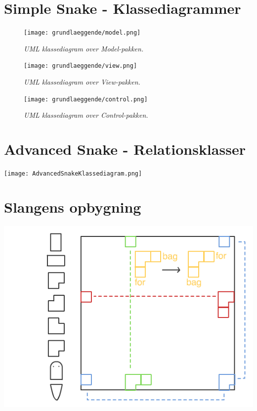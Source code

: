 \chapter{Simple Snake - Klassediagrammer}


\begin{figure}[h]
	\centering
    \texttt{[image: grundlaeggende/model.png]}
	\hspace{0.1\textwidth}
	\caption{\textit{UML klassediagram over Model-pakken.}}
\end{figure}

\begin{figure}[h]
	\centering
    \texttt{[image: grundlaeggende/view.png]}
	\hspace{0.1\textwidth}
	\caption{\textit{UML klassediagram over View-pakken.}}
\end{figure}

\begin{figure}[h]
	\centering
    \texttt{[image: grundlaeggende/control.png]}
	\hspace{0.1\textwidth}
	\caption{\textit{UML klassediagram over Control-pakken.}}
\end{figure}


\chapter{Advanced Snake - Relationsklasser}
\newpage
\begin{center}
\texttt{[image: AdvancedSnakeKlassediagram.png]}
\end{center}


\chapter{Slangens opbygning}
\includegraphics[width=1\textwidth]{SnakeGraphic.png}